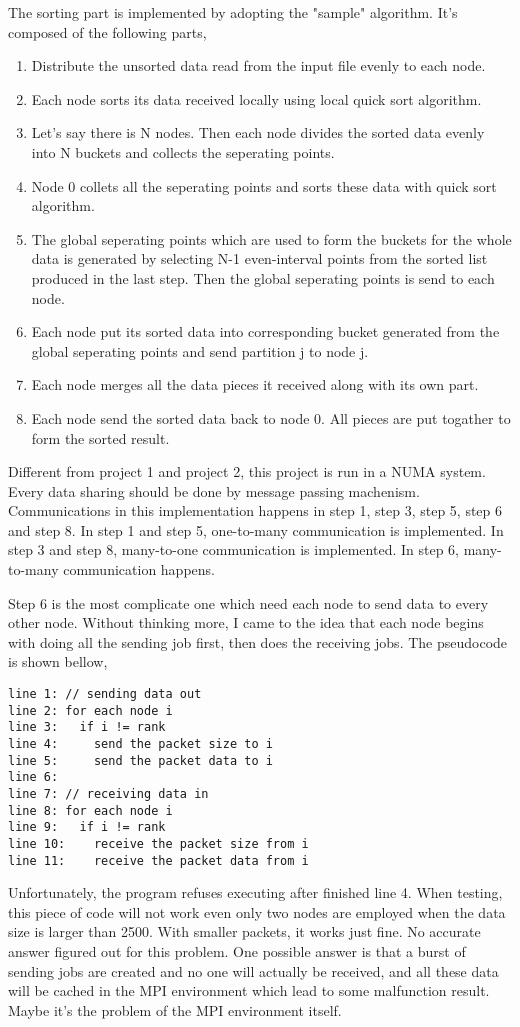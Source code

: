 \documentclass[11pt,letterpaper,oneside]{article}
\begin{document}
The sorting part is implemented by adopting the "sample" algorithm. It's composed of the following parts,
\begin{enumerate}
\item Distribute the unsorted data read from the input file evenly to each node.
\item Each node sorts its data received locally using local quick sort algorithm.
\item Let's say there is N nodes. Then each node divides the sorted data evenly into N buckets and collects the seperating points.
\item Node 0 collets all the seperating points and sorts these data with quick sort algorithm.
\item The global seperating points which are used to form the buckets for the whole data is generated by selecting N-1 even-interval points from the sorted list produced in the last step. Then the global seperating points is send to each node.
\item Each node put its sorted data into corresponding bucket generated from the global seperating points and send partition j to node j.
\item Each node merges all the data pieces it received along with its own part.
\item Each node send the sorted data back to node 0. All pieces are put togather to form the sorted result.
\end{enumerate}
Different from project 1 and project 2, this project is run in a NUMA system. Every data sharing should be done by message passing machenism. Communications in this implementation happens in step 1, step 3, step 5, step 6 and step 8. In step 1 and step 5, one-to-many communication is implemented. In step 3 and step 8, many-to-one communication is implemented. In step 6, many-to-many communication happens.

Step 6 is the most complicate one which need each node to send data to every other node. Without thinking more, I came to the idea that each node begins with doing all the sending job first, then does the receiving jobs. The pseudocode is shown bellow,
\begin{Verbatim}[frame=single]
line 1: // sending data out
line 2: for each node i
line 3:   if i != rank
line 4:     send the packet size to i
line 5:     send the packet data to i
line 6:
line 7: // receiving data in
line 8: for each node i
line 9:   if i != rank
line 10:    receive the packet size from i
line 11:    receive the packet data from i
\end{Verbatim}
Unfortunately, the program refuses executing after finished line 4. When testing, this piece of code will not work even only two nodes are employed when the data size is larger than 2500. With smaller packets, it works just fine. No accurate answer figured out for this problem. One possible answer is that a burst of sending jobs are created and no one will actually be received, and all these data will be cached in the MPI environment which lead to some malfunction result. Maybe it's the problem of the MPI environment itself.
\end{document}
